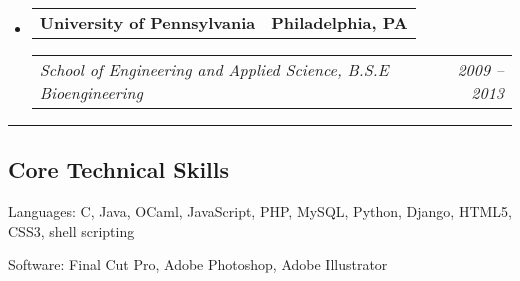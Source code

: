 \documentclass[10pt,letterpaper]{article}
\makeatletter
\newenvironment{indentsection}[1]%
{\begin{list}{}%
	{\setlength{\leftmargin}{#1}}%
	\item[]%
}
{\end{list}}
\newcommand{\headerrow}[2]
{\begin{tabular*}{\linewidth}{l@{\extracolsep{\fill}}r}
	#1 &
	#2 \\
\end{tabular*}}
\makeatother
\begin{document}
\begin{itemize}
	\parskip=0.1em

	\item 
	\headerrow
		{\textbf{University of Pennsylvania}}
		{\textbf{Philadelphia, PA}}
	
	\headerrow
		{\emph{School of Engineering and Applied Science, B.S.E Bioengineering}}
		{\emph{2009 -- 2013}}

\end{itemize}


\hrule
\vspace{-0.4em}
\subsection*{Core Technical Skills}

\begin{indentsection}{\parindent}
\begin{description*}
	\item[Languages:]
	C, Java, OCaml, JavaScript, PHP, MySQL, Python, Django, HTML5, CSS3, shell scripting
	\item[Software:] Final Cut Pro, Adobe Photoshop, Adobe Illustrator
\end{description*}
\end{indentsection}
\end{document}

